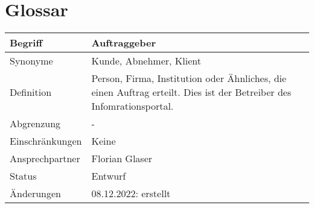 \section*{Glossar}\label{cha:glossar}


\begin{table}[H]
    \centering
    \label{gls:auftraggeber}
    \begin{tabularx}{\textwidth}{| l | X |}
        \hline
        Begriff         & Auftraggeber                                                                                                                   \\
        \hline
        Synonyme        & Kunde, Abnehmer, Klient                                                                                                        \\
        \hline
        Definition      & Person, Firma, Institution oder Ähnliches, die einen Auftrag erteilt. Dies ist der Betreiber des Infomrationsportal. \\
        \hline
        Abgrenzung      & -                                                                                                                              \\
        \hline
        Einschränkungen & Keine                                                                                                                          \\
        \hline
        Ansprechpartner & Florian Glaser                                                                                                                 \\
        \hline
        Status          & Entwurf                                                                                                                        \\
        \hline
        Änderungen      & 08.12.2022: erstellt                                                                                                           \\
        \hline
    \end{tabularx}
\end{table}


